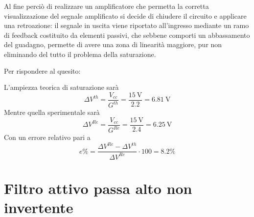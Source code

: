\documentclass[a4paper, 12pt, twoside]{report}
\begin{document}
\newpage

Al fine perciò di realizzare un amplificatore che permetta la corretta visualizzazione del segnale amplificato si decide di chiudere il circuito e applicare una retroazione: il segnale in uscita viene riportato all'ingresso mediante un ramo di feedback costituito da elementi passivi, che sebbene comporti un abbassamento del guadagno, permette di avere una zona di linearità maggiore, pur non eliminando del tutto il problema della saturazione.\newline 

Per rispondere al quesito:

L'ampiezza teorica di saturazione sarà
\[\Delta V^{th} = \dfrac{V_{cc}}{G^{th}} = \dfrac{\SI{15}{\volt}}{2.2} = \SI{6.81}{\volt}\]
Mentre quella sperimentale sarà
\[\Delta V^{Re} = \dfrac{V_{cc}}{G^{Re}} = \dfrac{\SI{15}{\volt}}{2.4} = \SI{6.25}{\volt}\]
Con un errore relativo pari a 
\[e \% = \dfrac{\Delta V^{Re}-\Delta V^{th}}{\Delta V^{Re}}\cdot100=8.2\%\]













\newpage
	\section{Filtro attivo passa alto non invertente}
	
\end{document}
